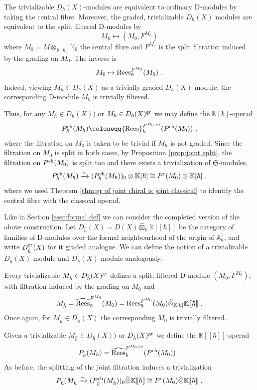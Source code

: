 \documentclass[11pt]{amsart}
\numberwithin{equation}{section}
\theoremstyle{definition}
\newcommand{\bb}{\mathbb}
\newcommand{\mf}{\mathfrak}
\newcommand{\Rees}{{\textup{Rees}}}
\newcommand{\spe}{{\textup{sp}}}
\newcommand{\fph}{{[\![\hbar]\!]}}
\newcommand{\gd}{{\textup{gr}}}
\newcommand{\ik}{{\bb K}}
\newcommand{\ch}{{\textup{ch}}}
\newcommand{\Ss}{{{\mf{S}}}}
\newcommand{\0}{{\textbf{0}}}
\def\IA{\mathbb{A}}
\def\ch{{\rm ch}}
\def \mf{\mathfrak}
\def \hhb{{\hat \hbar}}
\begin{document}
The trivializable $D_\hbar(X)$-modules are equivalent to ordinary D-modules by taking the central fibre. Moreover, the graded, trivializable $D_\hbar(X)$ modules are equivalent to the split, filtered D-modules by 
\[
M_\hbar \mapsto (M_0,F^{M_0})
\]
where $M_0= M\otimes_{\ik[\hbar]}\ik_0$ the central fibre and $F^{M_0}$ is the split filtration induced by the grading on $M_0$. The inverse is
\[
M_0\mapsto \Rees_\hbar^{F^{M_0}}(M_0)~.
\]
Indeed, viewing $M_\hbar\in D_\hbar(X)$ as a trivially graded $D_\hbar(X)$-module, the corresponding D-module $M_0$ is trivially filtered.


Thus, for any $M_\hbar \in D_\hbar(X))$ or $M_\hbar\in D_\hbar(X)^\gd$ we may define the $\ik[\hbar]$-operad
\[
P_\hbar^\ch(M_\hbar) \coloneqq \Rees^{F^{M_0,\spe}}_\hbar(P^\ch(M_0))~,
\]
where the filtration on $M_0$ is taken to be trivial if $M_\hbar$ is not graded. Since the filtration on $M_0$ is split in both cases, by Proposition \ref{prop:joint split}, the filtration on $P^\ch(M_0)$ is split too and there exists a trivialization of $\Ss$-modules,
\[
P^\ch_\hbar(M_\hbar) \xrightarrow{\sim} (P_\hbar^\ch(M_\hbar))_0 \otimes \ik[\hbar] \cong P^c(M_0)\otimes \ik[\hbar]~,
\]
where we used Theorem \ref{thm:gr of joint chiral is joint classical} to identify the central fibre with the classical operad.

Like in Section \ref{ssec:formal def} we can consider the completed version of the above construction. Let $D_{\hat \hbar}(X) = D(X)\widehat\boxtimes_\ik\ik\fph$ be the category of families of D-modules over the formal neighbourhood of the origin of $\IA^1_\hbar$, and write $D_{\hat \hbar}^\gd(X)$ for it graded analogue. We can define the notion of a trivializable $D_{\hat \hbar}(X)$-module and $D_{\hat \hbar}(X)$-module analogously.

Every trivializable $M_{\hat \hbar}\in D_{\hat \hbar}(X)^\gd$ defines a split, filtered D-module $(M_0,F^{M_0})$, with filtration induced by the grading on $M_0$ and 
\[
M_{\hat \hbar} = \widehat{\Rees}_{\hbar}^{F^{M_0}}(M_0) = \Rees_{\hbar}^{F^{M_0}}(M_0)\widehat{\otimes}_{\ik[\hbar]}\ik\fph~.
\]
Once again, for $M_{\hat \hbar}\in D_{\hat \hbar}(X)$ the corresponding $M_0$ is trivially filtered.

Given a trivializable $M_{\hat \hbar}\in D_{\hat \hbar}(X))$ or $D_{\hat \hbar}(X)^\gd$ we define the $\ik\fph$-operad
\[
P_{\hat \hbar}(M_\hbar) = \widehat{\Rees}_\hbar^{F^{M_0,\spe}}(P^\ch(M_0))~.
\]
As before, the splitting of the joint filtration induces a trivialization
\[
P_{\hat \hbar}(M_{\hat \hbar} \xrightarrow{\sim} (P^\ch_\hhb(M_\hhb))_0\widehat{\otimes}\ik\fph \cong P^c(M_0)\widehat{\otimes} \ik\fph~.
\]
\end{document}
